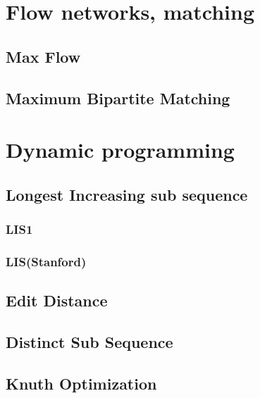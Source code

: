 \documentclass[11pt]{report}
\begin{document}

\chapter{Flow networks, matching}
\section{Max Flow}

\newpage
\section{Maximum Bipartite Matching}


\chapter{Dynamic programming}
\section{Longest Increasing sub sequence}
\subsection{LIS1}

\subsection{LIS(Stanford)}

\section{Edit Distance}

\section{Distinct Sub Sequence}

\section{Knuth Optimization}

\end{document}
